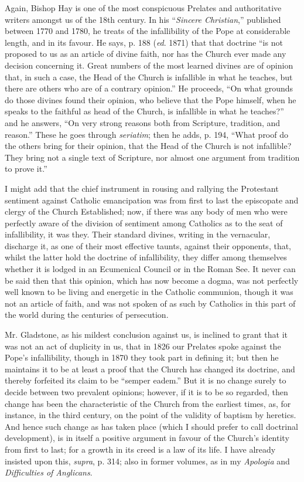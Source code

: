 Again, Bishop Hay is one of the most conspicuous Prelates and
authoritative writers amongst us of the 18th century. In his ``\emph{Sincere
Christian},'' published between 1770 and 1780, he treats of the
infallibility of the Pope at considerable length, and in its favour. He
says, p. 188 (\emph{ed}. 1871) that that doctrine ``is not proposed
to us as an article of divine faith, nor has the Church ever made any
decision concerning it. Great numbers of the most learned divines are of
opinion that, in such a case, the Head of the Church is infallible in
what he teaches, but there are others who are of a contrary
opinion.'' He proceeds, ``On what grounds do those divines found
their opinion, who believe that the Pope himself, when he speaks to the
faithful as head of the Church, is infallible in what he teaches?''
and he answers, ``On very strong reasons both from Scripture,
tradition, and reason.'' These he goes through \emph{seriatim}; then
he adds, p. 194, ``What proof do the others bring for their
opinion, that the Head of the Church is not infallible? They bring not a
single text of Scripture, nor almost one argument from tradition to
prove it.''

I might add that the chief instrument in rousing and rallying the
Protestant sentiment against Catholic emancipation was from first to
last the episcopate and clergy of the Church Established; now, if there
was any body of men who were perfectly aware of the division of
sentiment among Catholics as to the seat of infallibility, it was they.
Their standard divines, writing in the vernacular, discharge it, as one
of their most effective taunts, against their opponents, that, whilst
the latter hold the doctrine of infallibility, they differ among
themselves whether it is lodged in an Ecumenical Council or in the Roman
See. It never can be said then that this opinion, which has now become a
dogma, was not perfectly well known to be living and energetic in the
Catholic communion, though it was not an article of faith, and was not
spoken of as such by Catholics in this part of the world during the
centuries of persecution.

Mr. Gladstone, as his mildest conclusion against us, is inclined to
grant that it was not an act of duplicity in us, that in 1826 our
Prelates spoke against the Pope's infallibility, though in 1870 they
took part in defining it; but then he maintains it to be at least a
proof that the Church has changed its doctrine, and thereby forfeited
its claim to be ``semper eadem.'' But it is no change surely to
decide between two prevalent opinions; however, if it is to be so
regarded, then change has been the characteristic of the Church from the
earliest times, as, for instance, in the third century, on the
point of the validity of baptism by heretics. And hence such change as
has taken place (which I should prefer to call doctrinal development),
is in itself a positive argument in favour of the Church's identity from
first to last; for a growth in its creed is a law of its life. I have
already insisted upon this, \emph{supra}, p. 314; also in former
volumes, as in my \emph{Apologia} and \emph{Difficulties of Anglicans}.

